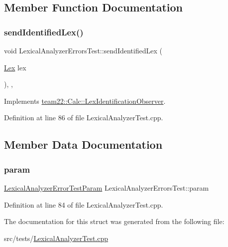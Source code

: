 \subsection{Member Function Documentation}
\mbox{\label{struct_lexical_analyzer_errors_test_ac943a4238a0eb77957e2027740603c44}} 
\subsubsection{\texorpdfstring{send\+Identified\+Lex()}{sendIdentifiedLex()}}
{\footnotesize\ttfamily void Lexical\+Analyzer\+Errors\+Test\+::send\+Identified\+Lex (\begin{DoxyParamCaption}\item[{\hyperlink{classteam22_1_1_calc_1_1_lex}{Lex}}]{lex }\end{DoxyParamCaption})\hspace{0.3cm}{\ttfamily [inline]}, {\ttfamily [override]}, {\ttfamily [virtual]}}



Implements \hyperlink{classteam22_1_1_calc_1_1_lex_identification_observer_ac139f75c560625ec6fdb2e34cf0d4884}{team22\+::\+Calc\+::\+Lex\+Identification\+Observer}.



Definition at line 86 of file Lexical\+Analyzer\+Test.\+cpp.



\subsection{Member Data Documentation}
\mbox{\label{struct_lexical_analyzer_errors_test_a61a8ef433e2118a8723bfd8f99029126}} 
\subsubsection{\texorpdfstring{param}{param}}
{\footnotesize\ttfamily \hyperlink{struct_lexical_analyzer_error_test_param}{Lexical\+Analyzer\+Error\+Test\+Param} Lexical\+Analyzer\+Errors\+Test\+::param}



Definition at line 84 of file Lexical\+Analyzer\+Test.\+cpp.



The documentation for this struct was generated from the following file\+:\begin{DoxyCompactItemize}
\item 
src/tests/\hyperlink{_lexical_analyzer_test_8cpp}{Lexical\+Analyzer\+Test.\+cpp}\end{DoxyCompactItemize}
